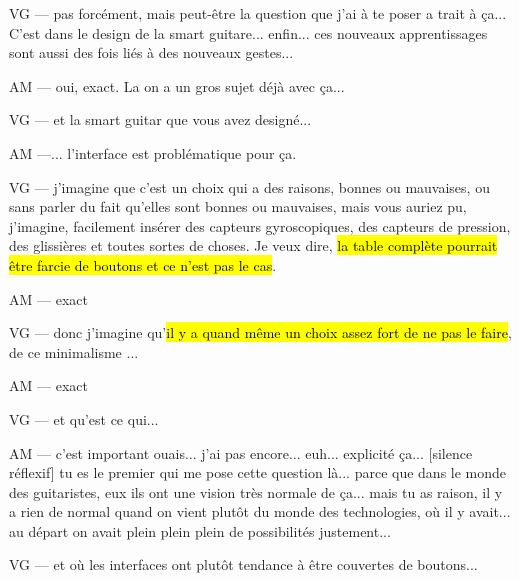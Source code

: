 VG — pas forcément, mais peut-être la question que j'ai à te poser a trait à ça... C'est dans le design de la smart guitare... enfin... ces nouveaux apprentissages sont aussi des fois liés à des nouveaux gestes... 

AM — oui, exact. La on a un gros sujet déjà avec ça... 

VG — et la smart guitar que vous avez designé... 

AM —... l'interface est problématique pour ça. 

VG — j'imagine que c'est un choix qui a des raisons, bonnes ou mauvaises, ou sans parler du fait qu'elles sont bonnes ou mauvaises, mais vous auriez pu, j'imagine, facilement insérer des capteurs gyroscopiques, des capteurs de pression, des glissières et toutes sortes de choses. Je veux dire, \hl{la table complète pourrait être farcie de boutons et ce n'est pas le cas}. 

AM — exact

VG — donc j'imagine qu'\hl{il y a quand même un choix assez fort de ne pas le faire}, de ce minimalisme ...

AM — exact 

VG — et qu'est ce qui... 

AM — c'est important ouais... j'ai pas encore... euh... explicité ça... [silence réflexif] tu es le premier qui me pose cette question là... parce que dans le monde des guitaristes, eux ils ont une vision très normale de ça... mais tu as raison, il y a rien de normal quand on vient plutôt du monde des technologies, où il y avait... au départ on avait plein plein plein de possibilités justement... 

VG — et où les interfaces ont plutôt tendance à être couvertes de boutons... 

